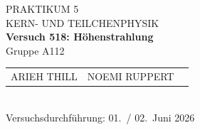\documentclass[%
paper=a4,       %
fontsize=11pt,  %
ngerman         %
]{scrreprt}
\begin{document}
\begin{titlepage}
  \centering
  \vspace*{2cm}
  
  {\Large PRAKTIKUM 5}\\[0.5cm]
  {\large KERN- UND TEILCHENPHYSIK }\\[1cm]
  
  {\LARGE\bfseries Versuch 518: Höhenstrahlung}\\[1cm]
  
  Gruppe A112\\[1cm]
  
  \begin{tabular}{lll}
    ARIEH THILL & NOEMI RUPPERT  \\
  \end{tabular}\\[2cm]
  
  Versuchsdurchführung: 01.~/ 02.~Juni 2026
  
  \vfill
\end{titlepage}

\tableofcontents
\clearpage
\clearpage
\setcounter{page}{1}
 
 
 
 
 



\appendix
\printbibliography{}
%
\end{document}

